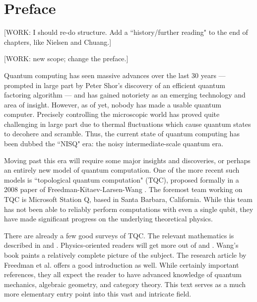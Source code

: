 \documentclass{article}
\theoremstyle{definition}
\numberwithin{figure}{section}
\begin{document}
\newpage

\tableofcontents

\newpage

\section{Preface}
\label{Preface}

[WORK: I should re-do structure. Add a ``history/further reading" to the end of chapters, like Nielsen and Chuang.]

[WORK: new scope; change the preface.]

Quantum computing has seen massive advances over the last 30 years — prompted in large part by Peter Shor's discovery of an efficient quantum factoring algorithm \cite{shor1994algorithms} — and has gained notoriety as an emerging technology and area of insight. However, as of yet, nobody has made a usable quantum computer. Precisely controlling the microscopic world has proved quite challenging in large part due to thermal fluctuations which cause quantum states to decohere and scramble. Thus, the current state of quantum computing has been dubbed the ``NISQ" era: the noisy intermediate-scale quantum era.

Moving past this era will require some major insights and discoveries, or perhaps an entirely new model of quantum computation. One of the more recent such models is ``topological quantum computation" (TQC), proposed formally in a 2008 paper of Freedman-Kitaev-Larsen-Wang \cite{freedman2003topological}. The foremost team working on TQC is Microsoft Station Q, based in Santa Barbara, California. While this team has not been able to reliably perform computations with even a single qubit, they have made significant progress on the underlying theoretical physics.

There are already a few good surveys of TQC. The relevant mathematics is described in \cite{bakalov2001lectures} and \cite{rowell2018mathematics}. Physics-oriented readers will get more out of \cite{preskill1999lecture} and \cite{nayak2008non}. Wang's book \cite{wang2010topological} paints a relatively complete picture of the subject. The research article by Freedman et al. \cite{freedman2002simulation} offers a good introduction as well. While certainly important references, they all expect the reader to have advanced knowledge of quantum mechanics, algebraic geometry, and category theory. This text serves as a much more elementary entry point into this vast and intricate field.
\end{document}
